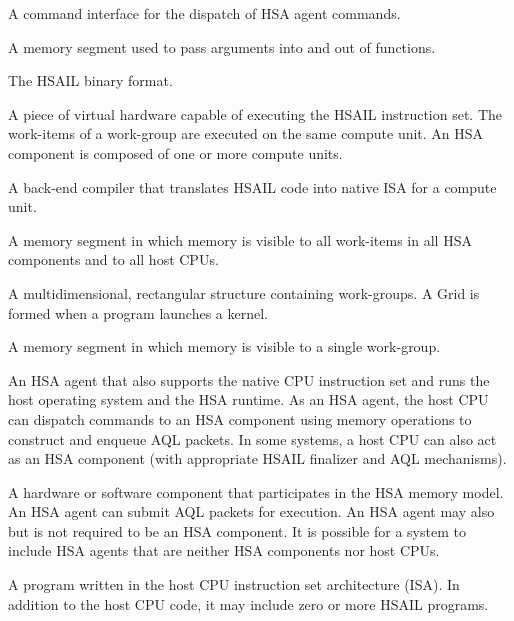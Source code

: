 \documentclass[final,oneside]{book}
\begin{document}
\begin{description}[itemsep=5pt,leftmargin=0cm, labelindent=0cm]

\item[Architected Queuing Language (AQL)] A command interface for the dispatch
  of HSA agent commands.

\item[Arg segment] A memory segment used to pass arguments into and out of
  functions.

\item[BRIG] The HSAIL binary format.

\item[Compute unit] A piece of virtual hardware capable of executing the HSAIL
  instruction set. The work-items of a work-group are executed on the same
  compute unit. An HSA component is composed of one or more compute units.

\item[Finalizer] A back-end compiler that translates HSAIL code into native ISA
  for a compute unit.

\item[Global segment] A memory segment in which memory is visible to all
  work-items in all HSA components and to all host CPUs.

\item[Grid] A multidimensional, rectangular structure containing work-groups. A
  Grid is formed when a program launches a kernel.

\item[Group segment] A memory segment in which memory is visible to a single
  work-group.

\item[Host CPU] An HSA agent that also supports the native CPU instruction set
  and runs the host operating system and the HSA runtime. As an HSA agent, the
  host CPU can dispatch commands to an HSA component using memory operations to
  construct and enqueue AQL packets. In some systems, a host CPU can also act as
  an HSA component (with appropriate HSAIL finalizer and AQL mechanisms).

\item[HSA agent] A hardware or software component that participates in the HSA
  memory model. An HSA agent can submit AQL packets for execution. An HSA agent
  may also but is not required to be an HSA component. It is possible for a
  system to include HSA agents that are neither HSA components nor host CPUs.

\item[HSA application] A program written in the host CPU instruction set
  architecture (ISA). In addition to the host CPU code, it may include zero or
  more HSAIL programs.


\end{description}
\end{document}
